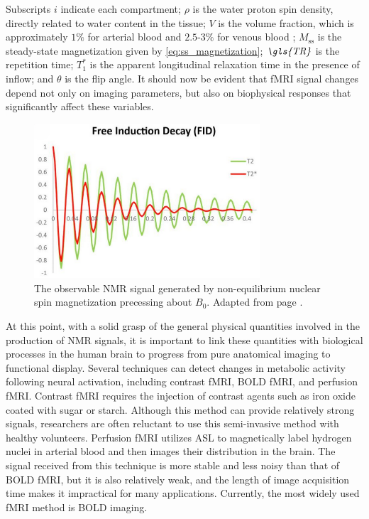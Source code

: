 Subscripts \( i \) indicate each compartment; \( \rho \) is the water proton spin density, directly related to water content in the tissue; \( V \) is the volume fraction, which is approximately \( 1\% \) for arterial blood \cite{Ito2001} and \( 2.5 \text{-} 3\% \) for venous blood \cite{An2002a, An2002b}; \( M_{\text{ss}} \) is the steady-state magnetization given by \autoref{eq:ss_magnetization}; \( \textit{\gls{TR}} \) is the repetition time; \( T_1^* \) is the apparent longitudinal relaxation time in the presence of inflow; and \( \theta \) is the \gls{flip angle}. It should now be evident that \gls{fMRI} signal changes depend not only on imaging parameters, but also on biophysical responses that significantly affect these variables.

\begin{figure}[htbp]
    \centering
    \includegraphics[width = 0.75\textwidth]{assets/images/FID.png}
    \caption[NMR Signal]{The observable \gls{NMR} signal generated by non-equilibrium nuclear spin magnetization precessing about $B_0$. Adapted from page \cite{T2_star_graph}.}
    \label{fig:T2_star}
\end{figure}

At this point, with a solid grasp of the general physical quantities involved in the production of \gls{NMR} signals, it is important to link these quantities with biological processes in the human brain to progress from pure anatomical imaging to functional display. Several techniques can detect changes in metabolic activity following neural activation, including contrast \gls{fMRI}, \gls{BOLD} \gls{fMRI}, and perfusion \gls{fMRI}. Contrast \gls{fMRI} requires the injection of contrast agents such as iron oxide coated with sugar or starch. Although this method can provide relatively strong signals, researchers are often reluctant to use this semi-invasive method with healthy volunteers. Perfusion \gls{fMRI} utilizes \gls{ASL} to magnetically label hydrogen nuclei in arterial blood and then images their distribution in the brain. The signal received from this technique is more stable and less noisy than that of \gls{BOLD} \gls{fMRI}, but it is also relatively weak, and the length of image acquisition time makes it impractical for many applications. Currently, the most widely used \gls{fMRI} method is \gls{BOLD} imaging.

